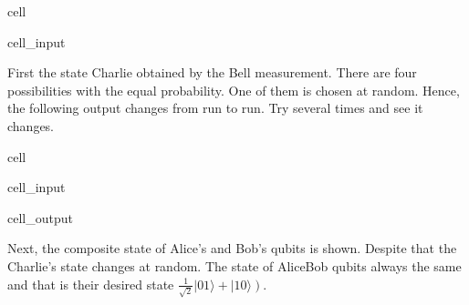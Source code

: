 \documentclass[letterpaper,10pt,english]{jupyterBook}
\begin{document}
\begin{sphinxuseclass}{cell}\begin{sphinxVerbatimInput}

\begin{sphinxuseclass}{cell_input}
\begin{sphinxVerbatim}[commandchars=\\\{\}]
  
\end{sphinxVerbatim}

\end{sphinxuseclass}\end{sphinxVerbatimInput}

\end{sphinxuseclass}
\sphinxAtStartPar
First the state Charlie obtained by the Bell measurement.  There are four possibilities with the equal probability.  One of them is chosen at random.  Hence, the following output changes from run to run.  Try several times and see it changes.

\begin{sphinxuseclass}{cell}\begin{sphinxVerbatimInput}

\begin{sphinxuseclass}{cell_input}
\begin{sphinxVerbatim}[commandchars=\\\{\}]
   \PYG{p}{[}\PYG{p}{]}
\end{sphinxVerbatim}

\end{sphinxuseclass}\end{sphinxVerbatimInput}
\begin{sphinxVerbatimOutput}

\begin{sphinxuseclass}{cell_output}
\noindent{}

\end{sphinxuseclass}\end{sphinxVerbatimOutput}

\end{sphinxuseclass}
\sphinxAtStartPar
Next, the composite state of Alice’s and Bob’s qubits is shown.  Despite that the Charlie’s state changes at random.  The state of Alice\sphinxhyphen{}Bob qubits always the same and that is their desired state \(\frac{1}{\sqrt{2}}\left|01\rangle+|10\rangle\right)\).
\end{document}
